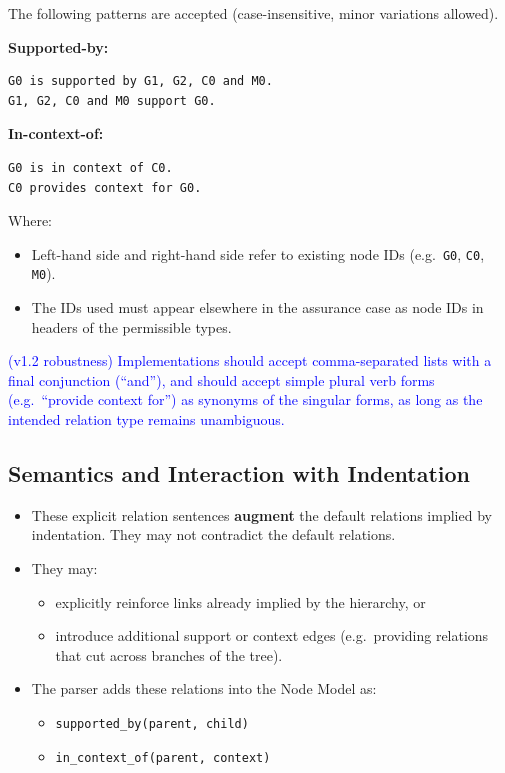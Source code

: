 \documentclass[11pt]{article}
\begin{document}
The following patterns are accepted (case-insensitive, minor variations allowed).

\textbf{Supported-by:}
\begin{verbatim}
G0 is supported by G1, G2, C0 and M0.
G1, G2, C0 and M0 support G0.
\end{verbatim}

\textbf{In-context-of:}
\begin{verbatim}
G0 is in context of C0.
C0 provides context for G0.
\end{verbatim}

Where:
\begin{itemize}[leftmargin=2em]
  \item Left-hand side and right-hand side refer to existing node IDs (e.g.\ \texttt{G0}, \texttt{C0}, \texttt{M0}).
  \item The IDs used must appear elsewhere in the assurance case as node IDs in headers of the permissible types.
\end{itemize}

\textcolor{blue}{(v1.2 robustness) Implementations should accept comma-separated lists with a final conjunction (``and''), and should accept simple plural verb forms (e.g.\ ``provide context for'') as synonyms of the singular forms, as long as the intended relation type remains unambiguous.}

\subsection{Semantics and Interaction with Indentation}

\begin{itemize}[leftmargin=2em]
  \item These explicit relation sentences \textbf{augment} the default relations implied by indentation. They may not contradict the default relations.
  \item They may:
  \begin{itemize}[leftmargin=1.5em]
    \item explicitly reinforce links already implied by the hierarchy, or
    \item introduce additional support or context edges (e.g.\ providing relations that cut across branches of the tree).
  \end{itemize}
  \item The parser adds these relations into the Node Model as:
  \begin{itemize}[leftmargin=1.5em]
    \item \texttt{supported\_by(parent, child)}
    \item \texttt{in\_context\_of(parent, context)}
  \end{itemize}
\end{itemize}
\end{document}
